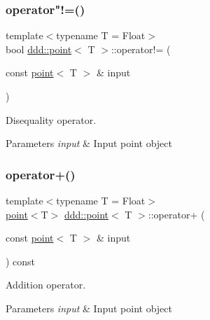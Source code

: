 \subsubsection{\texorpdfstring{operator"!=()}{operator!=()}}
{\footnotesize\ttfamily template$<$typename T = Float$>$ \\
bool \hyperlink{classddd_1_1point}{ddd\+::point}$<$ T $>$\+::operator!= (\begin{DoxyParamCaption}\item[{const \hyperlink{classddd_1_1point}{point}$<$ T $>$ \&}]{input }\end{DoxyParamCaption})\hspace{0.3cm}{\ttfamily [inline]}}



Disequality operator. 


\begin{DoxyParams}{Parameters}
{\em input} & Input point object \\
\hline
\end{DoxyParams}
\mbox{\label{classddd_1_1point_ab0b0c990b117bb889d34d44509b645be}} 
\subsubsection{\texorpdfstring{operator+()}{operator+()}}
{\footnotesize\ttfamily template$<$typename T = Float$>$ \\
\hyperlink{classddd_1_1point}{point}$<$T$>$ \hyperlink{classddd_1_1point}{ddd\+::point}$<$ T $>$\+::operator+ (\begin{DoxyParamCaption}\item[{const \hyperlink{classddd_1_1point}{point}$<$ T $>$ \&}]{input }\end{DoxyParamCaption}) const\hspace{0.3cm}{\ttfamily [inline]}}



Addition operator. 


\begin{DoxyParams}{Parameters}
{\em input} & Input point object \\
\hline
\end{DoxyParams}
\mbox{\label{classddd_1_1point_a5621f5a883c88d5588e09f9ff0de6575}} 
